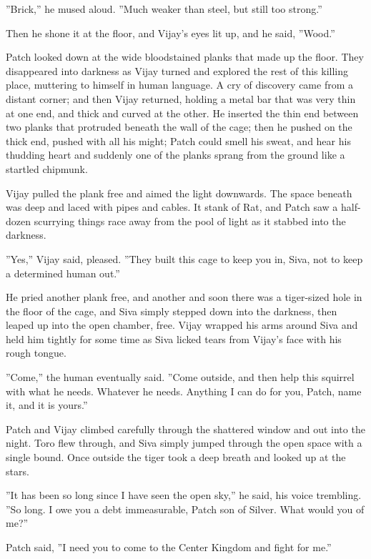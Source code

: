 \documentclass[12pt]{book}
\begin{document}
 ''Brick,'' he mused aloud. ''Much weaker than steel, but still too strong.''\par
 Then he shone it at the floor, and Vijay's eyes lit up, and he said, ''Wood.''\par
 Patch looked down at the wide bloodstained planks that made up the floor. They disappeared into darkness as Vijay turned and explored the rest of this killing place, muttering to himself in human language. A cry of discovery came from a distant corner; and then Vijay returned, holding a metal bar that was very thin at one end, and thick and curved at the other. He inserted the thin end between two planks that protruded beneath the wall of the cage; then he pushed on the thick end, pushed with all his might; Patch could smell his sweat, and hear his thudding heart %
 and suddenly one of the planks sprang from the ground like a startled chipmunk.\par
Vijay pulled the plank free and aimed the light downwards. The space beneath was deep and laced with pipes and cables. It stank of Rat, and Patch saw a half-dozen scurrying things race away from the pool of light as it stabbed into the darkness.\par
 ''Yes,'' Vijay said, pleased. ''They built this cage to keep you in, Siva, not to keep a determined human out.''\par
 He pried another plank free, and another %
 and soon there was a tiger-sized hole in the floor of the cage, and Siva simply stepped down into the darkness, then leaped up into the open chamber, free. Vijay wrapped his arms around Siva and held him tightly for some time as Siva licked tears from Vijay's face with his rough tongue.\par
 ''Come,'' the human eventually said. ''Come outside, and then help this squirrel with what he needs. Whatever he needs. Anything I can do for you, Patch, name it, and it is yours.''\par
 Patch and Vijay climbed carefully through the shattered window and out into the night. Toro flew through, and Siva simply jumped through the open space with a single bound. Once outside the tiger took a deep breath and looked up at the stars.\par
 ''It has been so long since I have seen the open sky,'' he said, his voice trembling. ''So long. I owe you a debt immeasurable, Patch son of Silver. What would you of me?''\par
 Patch said, ''I need you to come to the Center Kingdom and fight for me.''\par
\end{document}
